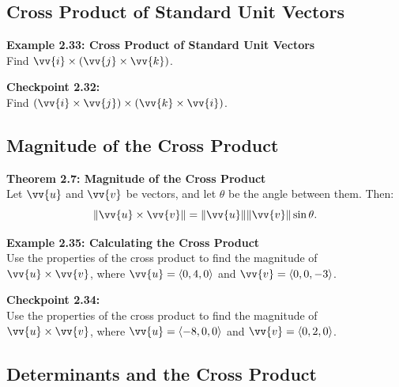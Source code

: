 \documentclass{article}
\begin{document}
\subsection*{Cross Product of Standard Unit Vectors}

\begin{examplebox}
    \textbf{Example 2.33: Cross Product of Standard Unit Vectors} \\
    Find \(\vv{i} \times (\vv{j} \times \vv{k})\).
\end{examplebox}

\begin{exercisebox}
    \textbf{Checkpoint 2.32:} \\
    Find \((\vv{i} \times \vv{j}) \times (\vv{k} \times \vv{i})\).
\end{exercisebox}

\subsection*{Magnitude of the Cross Product}

\begin{theorembox}
    \textbf{Theorem 2.7: Magnitude of the Cross Product} \\
    Let \(\vv{u}\) and \(\vv{v}\) be vectors, and let \(\theta\) be the angle between them. Then:
    \[
    \|\vv{u} \times \vv{v}\| = \|\vv{u}\| \|\vv{v}\| \sin \theta.
    \]
\end{theorembox}

\begin{examplebox}
    \textbf{Example 2.35: Calculating the Cross Product} \\
    Use the properties of the cross product to find the magnitude of \(\vv{u} \times \vv{v}\), where \(\vv{u} = \langle 0, 4, 0 \rangle\) and \(\vv{v} = \langle 0, 0, -3 \rangle\).
\end{examplebox}

\begin{exercisebox}
    \textbf{Checkpoint 2.34:} \\
    Use the properties of the cross product to find the magnitude of \(\vv{u} \times \vv{v}\), where \(\vv{u} = \langle -8, 0, 0 \rangle\) and \(\vv{v} = \langle 0, 2, 0 \rangle\).
\end{exercisebox}

\subsection*{Determinants and the Cross Product}
\end{document}
